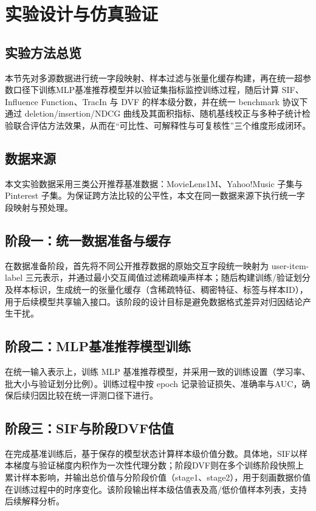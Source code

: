 
\chapter{实验设计与仿真验证}
\label{sec:experiment}

\section{实验方法总览}
本节先对多源数据进行统一字段映射、样本过滤与张量化缓存构建，再在统一超参数口径下训练MLP基准推荐模型并以验证集指标监控训练过程，随后计算 SIF、Influence Function、TracIn 与 DVF 的样本级分数，并在统一 benchmark 协议下通过 deletion/insertion/NDCG 曲线及其面积指标、随机基线校正与多种子统计检验联合评估方法效果，从而在“可比性、可解释性与可复核性”三个维度形成闭环。

\section{数据来源}
本文实验数据采用三类公开推荐基准数据：MovieLens1M、Yahoo!Music 子集与 Pinterest 子集。为保证跨方法比较的公平性，本文在同一数据来源下执行统一字段映射与预处理。

\section{阶段一：统一数据准备与缓存}
在数据准备阶段，首先将不同公开推荐数据的原始交互字段统一映射为 user-item-label 三元表示，并通过最小交互阈值过滤稀疏噪声样本；随后构建训练/验证划分及样本标识，生成统一的张量化缓存（含稀疏特征、稠密特征、标签与样本ID），用于后续模型共享输入接口。该阶段的设计目标是避免数据格式差异对归因结论产生干扰。

\section{阶段二：MLP基准推荐模型训练}
在统一输入表示上，训练 MLP 基准推荐模型，并采用一致的训练设置（学习率、批大小与验证划分比例）。训练过程中按 epoch 记录验证损失、准确率与AUC，确保后续归因比较在统一评测口径下进行。

\section{阶段三：SIF与阶段DVF估值}
在完成基准训练后，基于保存的模型状态计算样本级价值分数。具体地，SIF以样本梯度与验证梯度内积作为一次性代理分数；阶段DVF则在多个训练阶段快照上累计样本影响，并输出总价值与分阶段价值（stage1、stage2），用于刻画数据价值在训练过程中的时序变化。该阶段输出样本级估值表及高/低价值样本列表，支持后续解释分析。

